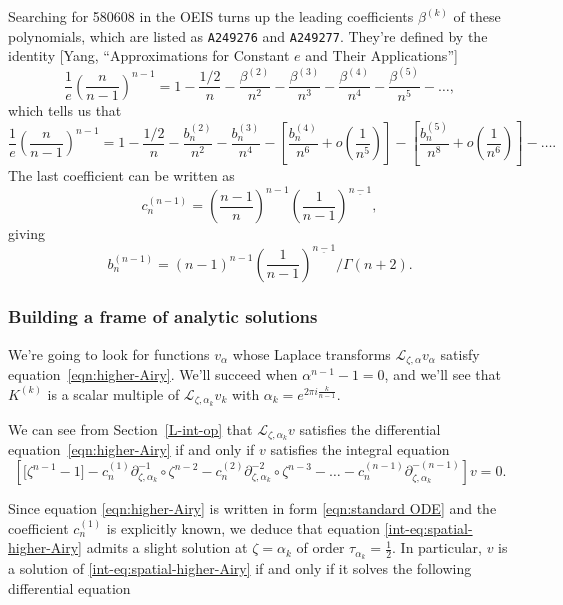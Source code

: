 \documentclass{article}
\theoremstyle{definition}
\newcommand{\laplace}{\mathcal{L}}
\begin{document}
Searching for 580608 in the OEIS turns up the leading coefficients $\beta^{(k)}$ of these polynomials, which are listed as {\tt A249276} and {\tt A249277}. They're defined by the identity [Yang, ``Approximations for Constant $e$ and Their Applications'']
\[ \frac{1}{e} \left(\frac{n}{n-1}\right)^{n-1} = 1 - \frac{1/2}{n} - \frac{\beta^{(2)}}{n^2} - \frac{\beta^{(3)}}{n^3} - \frac{\beta^{(4)}}{n^4} - \frac{\beta^{(5)}}{n^5} - \ldots, \]
which tells us that
\[ \frac{1}{e} \left(\frac{n}{n-1}\right)^{n-1} = 1 - \frac{1/2}{n} - \frac{b_n^{(2)}}{n^2} - \frac{b_n^{(3)}}{n^4} - \left[\frac{b_n^{(4)}}{n^6} + o\left(\frac{1}{n^5}\right)\right] - \left[\frac{b_n^{(5)}}{n^8} + o\left(\frac{1}{n^6}\right)\right] - \ldots. \]
The last coefficient can be written as
\[ c_n^{(n-1)} =\left(\frac{n-1}{n}\right)^{n-1} \left(\frac{1}{n-1}\right)^{\underline{n-1}}, 
\]
giving
\[ b_n^{(n-1)} = (n-1)^{n-1} \left(\frac{1}{n-1}\right)^{\underline{n-1}} \Big/ \Gamma(n+2). \]

\subsubsection{Building a frame of analytic solutions}

We're going to look for functions $v_\alpha$ whose Laplace transforms $\laplace_{\zeta, \alpha} v_\alpha$ satisfy equation~\eqref{eqn:higher-Airy}. We'll succeed when $\alpha^{n-1} - 1 = 0$, and we'll see that $K^{(k)}$ is a scalar multiple of $\laplace_{\zeta, \alpha_k} v_k$ with $\alpha_k=e^{2\pi i \tfrac{k}{n-1}}$.

We can see from Section~\ref{L-int-op} that $\laplace_{\zeta, \alpha_k} v$ satisfies the differential equation~\eqref{eqn:higher-Airy} if and only if $v$ satisfies the integral equation
\begin{equation}\label{int-eq:spatial-higher-Airy}
\left[ \big[ \zeta^{n-1} - 1 \big] - c_n^{(1)} \partial_{\zeta,\alpha_k}^{-1}\circ \zeta^{n-2} - c_n^{(2)} \partial_{\zeta,\alpha_k}^{-2} \circ\zeta^{n-3} - \ldots - c_n^{(n-1)} \partial_{\zeta,\alpha_k}^{-(n-1)} \right] v = 0.
\end{equation}

Since equation \eqref{eqn:higher-Airy} is written in form \eqref{eqn:standard ODE} and the coefficient $c_n^{(1)}$ is explicitly known, we deduce that equation \eqref{int-eq:spatial-higher-Airy} admits a slight solution at $\zeta={\alpha_k} $ of order $\tau_{\alpha_k}=\frac{1}{2}$. In particular, $v$ is a solution of \eqref{int-eq:spatial-higher-Airy} if and only if it solves the following differential equation
 
\end{document}
